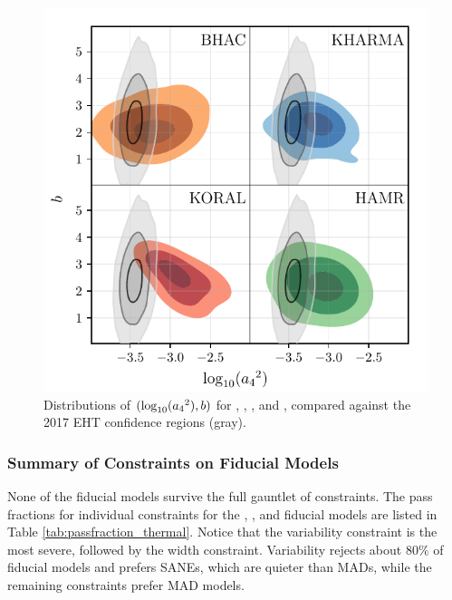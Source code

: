 \begin{figure}
  \centering
  \includegraphics[width=\columnwidth]{./figures/grmhd_triangle_debiased_combined.pdf}
  \caption{Distributions of $(\log_{10}({a_4}^2),b)$ for \bhac, \kharma, \koral, and \hamr, compared against the 2017 EHT confidence regions (gray). }
  \label{fig:cmp_VLBI_var}
\end{figure}


\subsubsection{Summary of Constraints on Fiducial Models}



\label{sec:summarythermal}

None of the fiducial models  survive the full gauntlet of constraints.   The pass fractions for individual constraints for the \bhac, \kharma, and \hamr fiducial models are listed in Table \ref{tab:passfraction_thermal}.  Notice that the variability constraint is the most severe, followed by the \mring width constraint.  Variability rejects about $80\%$ of fiducial models and prefers SANEs, which are quieter than MADs, while the remaining constraints prefer MAD models.

